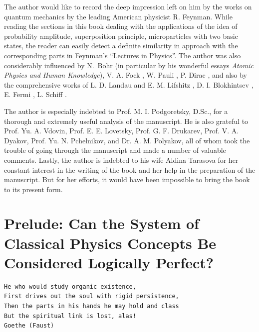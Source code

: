 \documentclass[a4paper,sfsidenotes,colorlinks=true]{tufte-book}
\numberwithin{equation}{section}
\numberwithin{figure}{section}
\begin{document}
The author would like to record the deep impression left on him by the
works on quantum mechanics by the leading American physicist
R. Feynman. \citep{feynman-1965a,feynman-1965b} While reading the
sections in this book dealing with the applications of the idea of
probability amplitude, superposition principle, microparticles with
two basic states, the reader can easily detect a definite similarity
in approach with the corresponding parts in Feynman's ``Lectures in
Physics''. The author was also considerably influenced by N.~Bohr (in
particular by his wonderful essays \emph{Atomic Physics and Human
  Knowledge})\citep{bohr-1958b}, V. A. Fock \citep{fock-1978,fock-1957},
W. Pauli \citep{pauli-1946}, P. Dirac \citep{dirac-1958}, and also by the comprehensive works of L. D. Landau and E. M. Lifshitz \citep{landau-1977}, D. I. Blokhintsev \citep{blokhintsev-1964}, E. Fermi \citep{fermi-1961}, L. Schiff \citep{schiff-1968}.
	
The author is especially indebted to Prof. M. I. Podgoretsky, D.Sc., for a thorough and extremely useful analysis of the manuscript. He is also grateful to Prof. Yu. A. Vdovin, Prof. E. E. Lovetsky, Prof. G. F. Drukarev, Prof. V. A. Dyakov, Prof. Yu. N. Pchelnikov, and Dr. A. M. Polyakov, all of whom took the trouble of going through the manuscript and made a number of valuable comments. Lastly, the author is indebted to his wife Aldina Tarasova for her constant interest in the writing of the book and her help in the preparation of the manuscript. But for her efforts, it would have been impossible to bring the book to its present form.
\cleardoublepage


%


\chapter*{Prelude: Can the System of Classical Physics Concepts Be Considered Logically Perfect?}
{}
\label{interlude-01}
\begin{Verbatim}[formatcom=\color{darkgray},fontsize=\small]
He who would study organic existence,
First drives out the soul with rigid persistence,
Then the parts in his hands he may hold and class
But the spiritual link is lost, alas!
Goethe (Faust)
\end{Verbatim}
\indent
\end{document}
